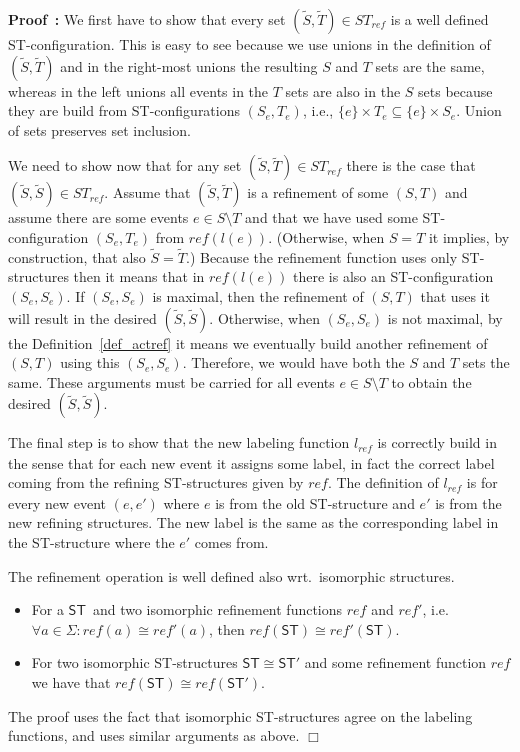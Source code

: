 \documentclass[submission,copyright,creativecommons]{eptcs}
\newenvironment{proof}[1][\!\!\,]{\vspace{1ex}\noindent\textbf{Proof #1: }}{\hfill$\Box$\vspace{2ex}}
\newcounter{case}
\newcommand\ST{\ensuremath{\mathsf{ST}}}
\newcommand\reffun{\ensuremath{\mathit{ref}}}
\newcommand\refinement[1]{\ensuremath{\widetilde{#1}}}
\newcommand\isomorphic{\ensuremath{\cong}}
\begin{document}
\begin{proof}
We first have to show that every set $(\refinement{S},\refinement{T})\in ST_{\reffun}$ is a well defined ST-configuration. This is easy to see because we use unions in the definition of $(\refinement{S},\refinement{T})$ and in the right-most unions the resulting $S$ and $T$ sets are the same, whereas in the left unions all events in the $T$ sets are also in the $S$ sets because they are build from ST-configurations $(S_{e},T_{e})$, i.e., $\{e\}\times T_{e}\subseteq\{e\}\times S_{e}$. Union of sets preserves set inclusion.

We need to show now that for any set $(\refinement{S},\refinement{T})\in ST_{\reffun}$ there is the case that $(\refinement{S},\refinement{S})\in ST_{\reffun}$. Assume that $(\refinement{S},\refinement{T})$ is a refinement of some $(S,T)$ and assume there are some events $e\in S\setminus T$ and that we have used some ST-configuration $(S_{e},T_{e})$ from $\reffun(l(e))$.
(Otherwise, when $S=T$ it implies, by construction, that also $\refinement{S}=\refinement{T}$.)
Because the refinement function uses only ST-structures then it means that in $\reffun(l(e))$ there is also an ST-configuration $(S_{e},S_{e})$. 
If $(S_{e},S_{e})$ is maximal, then the refinement of $(S,T)$ that uses it will result in the desired $(\refinement{S},\refinement{S})$.
Otherwise, when $(S_{e},S_{e})$ is not maximal, by the Definition~\ref{def_actref} it means we eventually build another refinement of $(S,T)$ using this $(S_{e},S_{e})$. Therefore, we would have both the $S$ and $T$ sets the same. These arguments must be carried for all events $e\in S\setminus T$ to obtain the desired $(\refinement{S},\refinement{S})$.

The final step is to show that the new labeling function $l_{\reffun}$ is correctly build in the sense that for each new event it assigns some label, in fact the correct label coming from the refining ST-structures given by \reffun. The definition of $l_{\reffun}$ is for every new event $(e,e')$ where $e$ is from the old ST-structure and $e'$ is from the new refining structures. The new label is the same as the corresponding label in the ST-structure where the $e'$ comes from.

The refinement operation is well defined also wrt.\ isomorphic structures.
\begin{itemize}
\item For a \ST\ and two isomorphic refinement functions $\reffun$ and $\reffun'$, i.e.\ $\forall a\in\Sigma:\reffun(a)\isomorphic\reffun'(a)$, then $\reffun(\ST)\isomorphic\reffun'(\ST)$.
\item For two isomorphic ST-structures $\ST\isomorphic\ST'$ and some refinement function $\reffun$ we have that \linebreak $\reffun(\ST)\isomorphic\reffun(\ST')$.
\end{itemize}

The proof uses the fact that isomorphic ST-structures agree on the labeling functions, and uses similar arguments as above.
\end{proof}
\end{document}
